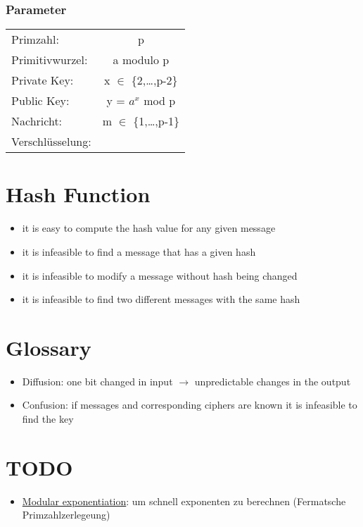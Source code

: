 \documentclass[a4paper]{article}
\begin{document}
\subsubsection{Parameter}

\begin{table}[h]
	\centering
	\begin{tabular}{lc}
	Primzahl: & p\\

	Primitivwurzel: & a modulo p \\

	Private Key: & x $\in$ \{2,\dots,p-2\} \\

	Public Key: & y = $a^x$ mod p \\

	Nachricht: & m $\in$ \{1,\dots,p-1\} \\

	Verschlüsselung:


	\end{tabular}
\end{table}

\section{Hash Function}
\begin{itemize}
    \item it is easy to compute the hash value for any given message
    \item it is infeasible to find a message that has a given hash
    \item it is infeasible to modify a message without hash being changed
    \item it is infeasible to find two different messages with the same hash
\end{itemize}

\section{Glossary}
\begin{itemize}
    \item Diffusion: one bit changed in input $\rightarrow$ unpredictable changes in the output
    \item Confusion: if messages and corresponding ciphers are known it is infeasible to find the key
\end{itemize}

\section{TODO}

\begin{itemize}
    \item \href{http://en.wikipedia.org/wiki/Modular_exponentiation}{Modular exponentiation}: um schnell exponenten zu berechnen (Fermatsche Primzahlzerlegeung) 
\end{itemize}
\end{document}
